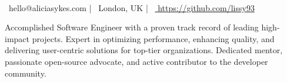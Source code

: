 \documentclass[]{awesome-cv}
\begin{document}
\begin{center}
      \\
    \vspace{2mm}
    {\faEnvelope\ hello@aliciasykes.com} | {\faMapMarker\ London, UK} | {\faLink\ \href{ https://github.com/lissy93 }{ https://github.com/lissy93 }}
\end{center}


\begin{cvpersonalstatement}
  \item { Accomplished Software Engineer with a proven track record of leading high-impact projects. Expert in optimizing performance, enhancing quality, and delivering user-centric solutions for top-tier organizations. Dedicated mentor, passionate open-source advocate, and active contributor to the developer community. }
\end{cvpersonalstatement}


\end{document}
